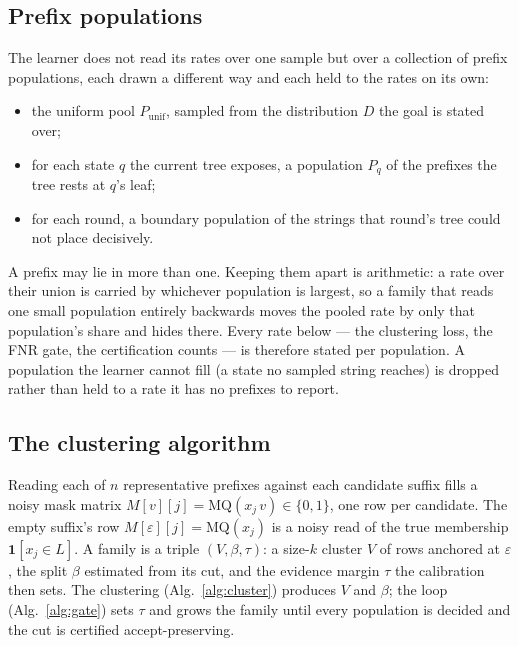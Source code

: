 \subsection{Prefix populations}\label{subsec:populations}

The learner does not read its rates over one sample but over a collection of prefix
populations, each drawn a different way and each held to the rates on its own:
\begin{itemize}
\item the uniform pool $P_{\mathrm{unif}}$, sampled from the distribution $D$ the goal is
stated over;
\item for each state $q$ the current tree exposes, a population $P_q$ of the prefixes the
tree rests at $q$'s leaf;
\item for each round, a boundary population of the strings that round's tree could not
place decisively.
\end{itemize}
A prefix may lie in more than one. Keeping them apart is arithmetic: a rate over their
union is carried by whichever population is largest, so a family that reads one small
population entirely backwards moves the pooled rate by only that population's share and
hides there. Every rate below --- the clustering loss, the FNR gate, the certification
counts --- is therefore stated per population. A population the learner cannot fill (a
state no sampled string reaches) is dropped rather than held to a rate it has no prefixes
to report.

\subsection{The clustering algorithm}\label{subsec:clustering}

Reading each of $n$ representative prefixes against each candidate suffix fills a noisy
mask matrix $M[v][j]=\mathrm{MQ}(x_j\,v)\in\{0,1\}$, one row per candidate. The empty
suffix's row $M[\varepsilon][j]=\mathrm{MQ}(x_j)$ is a noisy read of the true membership
$\mathbf 1[x_j\in L]$. A family is a triple $(V,\beta,\tau)$: a size-$k$ cluster $V$ of
rows anchored at $\varepsilon$, the split $\beta$ estimated from its cut, and the
evidence margin $\tau$ the calibration then sets. The clustering (Alg.~\ref{alg:cluster})
produces $V$ and $\beta$; the loop (Alg.~\ref{alg:gate}) sets $\tau$ and grows the family
until every population is decided and the cut is certified accept-preserving.

